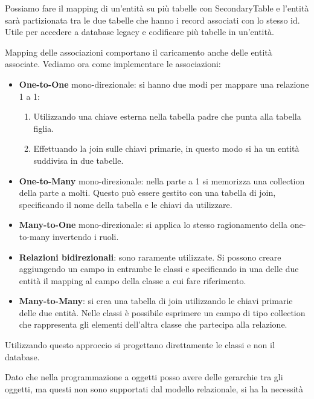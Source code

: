 Possiamo fare il mapping di un'entità su più tabelle con SecondaryTable e l'entità
sarà partizionata tra le due tabelle che hanno i record associati con lo stesso
id. Utile per accedere a database legacy e codificare più tabelle in un'entità.

Mapping delle associazioni comportano il caricamento anche delle entità associate.
Vediamo ora come implementare le associazioni:
\begin{itemize}
      \item \textbf{One-to-One} mono-direzionale: si hanno due modi per mappare
            una relazione 1 a 1:
            \begin{enumerate}
                  \item Utilizzando una chiave esterna nella tabella padre che punta
                        alla tabella figlia.
                  \item Effettuando la join sulle chiavi primarie, in questo modo
                        si ha un entità suddivisa in due tabelle.
            \end{enumerate}
      \item \textbf{One-to-Many} mono-direzionale: nella parte a 1 si memorizza
            una collection della parte a molti. Questo può essere gestito con una
            tabella di join, specificando il nome della tabella e le chiavi da
            utilizzare.
      \item \textbf{Many-to-One} mono-direzionale: si applica lo stesso ragionamento
            della one-to-many invertendo i ruoli.
      \item \textbf{Relazioni bidirezionali}: sono raramente utilizzate. Si possono
            creare aggiungendo un campo in entrambe le classi e specificando in una
            delle due entità il mapping al campo della classe a cui fare riferimento.
      \item \textbf{Many-to-Many}: si crea una tabella di join utilizzando le
            chiavi primarie delle due entità. Nelle classi è possibile esprimere
            un campo di tipo collection che rappresenta gli elementi dell'altra
            classe che partecipa alla relazione.
\end{itemize}
\begin{nota}
      Utilizzando questo approccio si progettano direttamente le classi e non il
      database.
\end{nota}
Dato che nella programmazione a oggetti posso avere delle gerarchie tra gli
oggetti, ma questi non sono supportati dal modello relazionale, si ha la necessità
